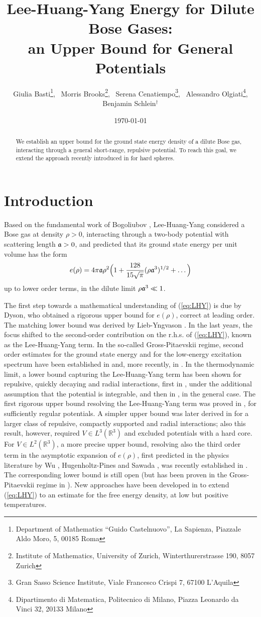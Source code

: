 \documentclass[a4paper,11pt]{article}
\title{Lee-Huang-Yang Energy for Dilute Bose Gases: \\ an Upper Bound for General Potentials}
\date{\today}
\author{Giulia Basti\footnote{Department of Mathematics ``Guido Castelnuovo'', La Sapienza, Piazzale Aldo Moro, 5, 00185 Roma}, \, Morris Brooks\footnote{Institute of Mathematics, University of Zurich, Winterthurerstrasse 190, 8057 Zurich}, \, Serena Cenatiempo\footnote{Gran Sasso Science Institute, Viale Francesco Crispi 7, 67100 L'Aquila}, \, Alessandro Olgiati\footnote{Dipartimento di Matematica, Politecnico di Milano, Piazza Leonardo da Vinci 32, 20133 Milano}, \\ Benjamin Schlein$^\dagger$}
\def\bR{\mathbb{R}}
\numberwithin{equation}{section}
\begin{document}
\maketitle 

\begin{abstract}
We establish an upper bound for the ground state energy density of a dilute Bose gas, interacting through a general short-range, repulsive potential. To reach this goal, we extend the approach recently introduced in \cite{BBCOS} for hard spheres. 
\end{abstract}

\section{Introduction}

Based on the fundamental work of Bogoliubov \cite{B}, Lee-Huang-Yang \cite{LHY} considered a Bose gas at density $\rho > 0$, interacting through a two-body potential with scattering length $\frak{a} > 0$, and predicted that its ground state energy per unit volume has the form 
\begin{equation}\label{eq:LHY} 
e (\rho) = 4\pi \frak{a} \rho^2 \Big( 1+ \frac{128}{15 \sqrt{\pi}} (\rho \frak{a}^3)^{1/2} + \dots \Big) \end{equation} 
up to lower order terms, in the dilute limit $\rho \frak{a}^3 \ll 1$.

The first step towards a mathematical understanding of (\ref{eq:LHY}) is due by Dyson, who obtained a rigorous upper bound for $e(\rho)$, correct at leading order. The matching lower bound was derived by Lieb-Yngvason \cite{LY}. In the last years, the focus shifted to the second-order contribution on the r.h.s. of (\ref{eq:LHY}), known as the Lee-Huang-Yang term. In the so-called Gross-Pitaevskii regime, second order estimates for the ground state energy and for the low-energy excitation spectrum have been established in \cite{BBCS1,BBCS2} and, more recently, in \cite{HST,B}. In the thermodynamic limit, a lower bound capturing the Lee-Huang-Yang term has been shown for repulsive, quickly decaying and radial interactions, first in \cite{FS1}, under the additional assumption that the potential is integrable, and then in \cite{FS2}, in the general case. The first rigorous upper bound resolving the Lee-Huang-Yang term was proved in \cite{YY}, for sufficiently regular potentials. A simpler upper bound was later derived in \cite{BCS} for a larger class of repulsive, compactly supported and radial interactions; also this result, however, required $V \in L^3 (\bR^3)$ and excluded potentials with a hard core. For $V \in L^2 (\bR^3)$, a more precise upper bound, resolving also the third order term in the asymptotic expansion of $e(\rho)$, first predicted in the physics literature by Wu \cite{Wu}, Hugenholtz-Pines \cite{HP} and Sawada \cite{Sa}, was recently established in \cite{BOSS}. The corresponding lower bound is still open (but has been proven in the Gross-Pitaevskii regime in \cite{COSS}). New approaches have been developed in \cite{HHNST,HHST,FJGMOT} to extend (\ref{eq:LHY}) to an estimate for the free energy density, at low but positive temperatures.
\end{document}
